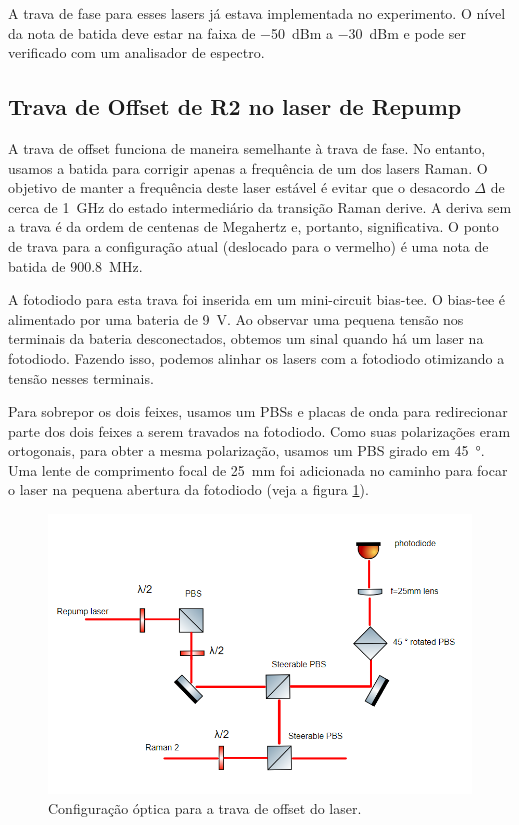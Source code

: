 A trava de fase para esses lasers já estava implementada no experimento. O nível da nota de batida deve estar na faixa de \SI{-50}{dBm} a \SI{-30}{dBm} e pode ser verificado com um analisador de espectro.

\subsection{Trava de Offset de R2 no laser de Repump}
A trava de offset funciona de maneira semelhante à trava de fase. No entanto, usamos a batida para corrigir apenas a frequência de um dos lasers Raman. O objetivo de manter a frequência deste laser estável é evitar que o desacordo $\Delta$ de cerca de \SI{1}{GHz} do estado intermediário da transição Raman derive. A deriva sem a trava é da ordem de centenas de Megahertz e, portanto, significativa. O ponto de trava para a configuração atual (deslocado para o vermelho) é uma nota de batida de \SI{900,8}{MHz}.

A fotodiodo para esta trava foi inserida em um mini-circuit bias-tee. O bias-tee é alimentado por uma bateria de \SI{9}{V}. Ao observar uma pequena tensão nos terminais da bateria desconectados, obtemos um sinal quando há um laser na fotodiodo. Fazendo isso, podemos alinhar os lasers com a fotodiodo otimizando a tensão nesses terminais.

Para sobrepor os dois feixes, usamos um \gls{PBS}s e placas de onda para redirecionar parte dos dois feixes a serem travados na fotodiodo. Como suas polarizações eram ortogonais, para obter a mesma polarização, usamos um \gls{PBS} girado em \SI{45}{\degree}. Uma lente de comprimento focal de \SI{25}{mm} foi adicionada no caminho para focar o laser na pequena abertura da fotodiodo (veja a figura \ref{fig:lock_optics}).

\begin{figure}
    \centering
    \includegraphics[width=0.5\linewidth]{figures/lock_optics.PNG}
    \caption{Configuração óptica para a trava de offset do laser.}
    \label{fig:lock_optics}
\end{figure}

